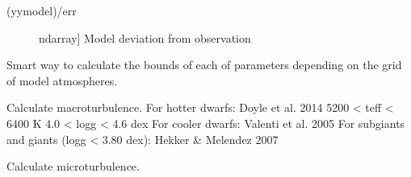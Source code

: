 \documentclass[letterpaper,10pt,english]{sphinxmanual}
\begin{document}
\begin{fulllineitems}
\begin{fulllineitems}
\begin{description}
\end{description}
\begin{description}
\item[{(y\sphinxhyphen{}ymodel)/err}] \leavevmode{[}ndarray{]}
Model deviation from observation

\end{description}

\end{fulllineitems}


\begin{fulllineitems}
\label{\detokenize{index:FASMA.minimization.MinimizeSynth.parinfo_limit}}
Smart way to calculate the bounds of each of parameters depending on
the grid of model atmospheres.

\end{fulllineitems}


\end{fulllineitems}


\begin{fulllineitems}
\label{\detokenize{index:FASMA.minimization.getMac}}
Calculate macroturbulence.
For hotter dwarfs: Doyle et al. 2014
5200 \textless{} teff \textless{} 6400 K
4.0 \textless{} logg \textless{} 4.6 dex
For cooler dwarfs: Valenti et al. 2005
For subgiants and giants (logg \textless{} 3.80 dex): Hekker \& Melendez 2007

\end{fulllineitems}


\begin{fulllineitems}
\label{\detokenize{index:FASMA.minimization.getMic}}
Calculate microturbulence.

\end{fulllineitems}
\end{document}
